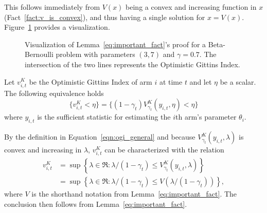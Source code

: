 \begin{myproof}[Proof.]
	This follows immediately from $V(x)$ being a convex and increasing function in $x$ (Fact~\ref{fact:v_is_convex}), and thus having a single solution for $x = V(x)$. Figure~\ref{fig:visaulize_gx_proof} provides a visualization.
	\begin{figure}
		\centering
		
		\caption{Visualization of Lemma~\ref{eq:important_fact}'s proof for a Beta-Bernoulli problem with parameters $(3,7)$ and $\gamma=0.7$. The intersection of the two lines represents the Optimistic Gittins Index.}
		\label{fig:visaulize_gx_proof}
	\end{figure}
\end{myproof}
\begin{corollary} \label{cor:equivalent_event}
	Let $v^K_{i,t}$ be the Optimistic Gittins Index of arm $i$ at time $t$ and let $\eta$ be a scalar. The following equivalence holds
	\[
	\{v^K_{i,t} < \eta \} = \{(1-\gamma_t)V^K_{\gamma_t}(y_{i,t}, \eta) < \eta\}\]
	where $y_{i,t}$ is the sufficient statistic for estimating the $i$th arm's parameter $\theta_i$.
\end{corollary}
\begin{myproof}[Proof.]
	By the definition in Equation~\eqref{eqn:ogi_general} and because $V^K_{\gamma_t}(y_{i,t}, \lambda)$ is convex and increasing in $\lambda$, $v^K_{i,t}$  can be characterized with the relation 
	\begin{align*}%
	v^K_{i,t} & = \sup\left\{\lambda \in \Re : \lambda/(1-\gamma_t) \le V^K_{\gamma_t}(y_{i,t}, \lambda)  \right\} \\
	 &= \sup\left\{\lambda  \in \Re : \lambda/(1-\gamma_t) \le V(\lambda/(1-\gamma_t))  \right\},
	\end{align*}
	where $V$ is the shorthand notation from Lemma~\ref{eq:important_fact}. The conclusion then follows from Lemma~\ref{eq:important_fact}.
\end{myproof}

